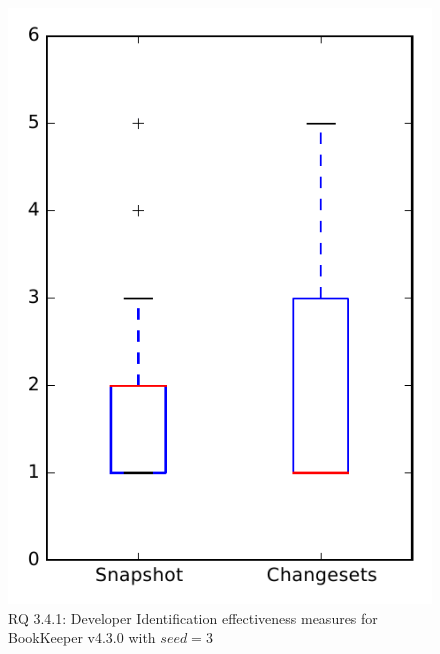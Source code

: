 
\begin{figure}
\centering
\includegraphics[height=0.4\textheight]{figures/dit_seed/rq1_bookkeeper_3}
\caption{RQ 3.4.1: Developer Identification effectiveness measures for BookKeeper v4.3.0 with $seed=3$}
\label{fig:dit_seed:rq1:bookkeeper}
\end{figure}
